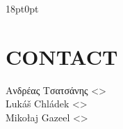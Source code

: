 \documentclass[a4paper,english]{article}
\begin{document}
\begin{adjustwidth}{18pt}{0pt}


    \section{CONTACT}
    Ανδρέας Τσατσάνης <>\\[0.1cm]\MANbr
    Lukáš Chládek <>\\[0.1cm]\MANbr
    Mikołaj Gazeel <>\\[0.1cm]\MANbr

\end{adjustwidth}
\end{document}
